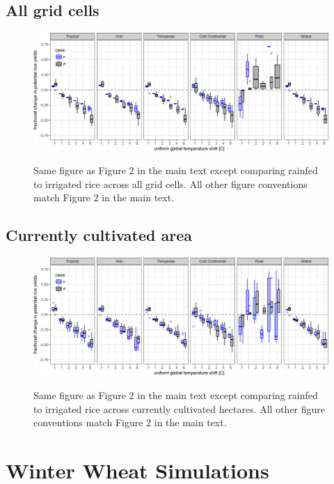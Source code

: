 \documentclass[10pt]{article}
\begin{document}
\subsection{All grid cells}
\begin{figure}[h!]
\includegraphics[width=\textwidth]{s_rice_sim_CG.png}\\
\caption{Same figure as Figure 2 in the main text except comparing rainfed to irrigated rice across all grid cells. All other figure conventions match Figure 2 in the main text.}
\label{fig:maizeCG}
\end{figure}

\subsection{Currently cultivated area}
\begin{figure}[h!]
\includegraphics[width=\textwidth]{s_rice_sim_CG_area_weight.png}\\
\caption{Same figure as Figure 2 in the main text except comparing rainfed to irrigated rice across currently cultivated hectares. All other figure conventions match Figure 2 in the main text.}
\label{fig:maizeCG}
\end{figure}


\clearpage
\section{Winter Wheat Simulations}
\end{document}
